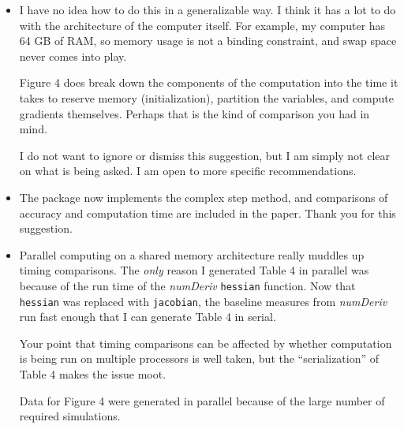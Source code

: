 \documentclass{article}
\newcommand{\pkg}[1]{\emph{#1}}
\newcommand{\code}[1]{\texttt{#1}}
\newcommand{\func}[1]{\code{#1}}
\newenvironment{response}{\normalfont}{\vspace{\baselineskip}}
\begin{document}
\begin{enumerate}[align=left]
\begin{response}
\begin{itemize}
\item I have no idea how to do this in a generalizable way.  I think
  it has a lot to do with the architecture of the computer
  itself.  For example, my computer has 64 GB of RAM, so memory usage
  is not a binding constraint, and swap space never comes into play.

  Figure 4 does break down the components of the computation
  into the time it takes to reserve memory (initialization), partition
  the variables, and compute gradients themselves.  Perhaps that is
  the kind of comparison you had in mind.

  I do not want to ignore or dismiss this suggestion, but I am simply not clear on
  what is being asked.  I am open to more specific recommendations.

\item The package now implements the complex step method, and comparisons of
  accuracy and computation time are included in the paper.  Thank you
  for this suggestion.

\item Parallel computing on a shared memory architecture really
  muddles up timing comparisons.  The \emph{only} reason I generated
  Table 4 in parallel was because of the run time of the \pkg{numDeriv} \func{hessian}
  function. Now that \func{hessian} was replaced with \func{jacobian},
  the baseline measures from \pkg{numDeriv} run fast enough that I can
  generate Table 4 in serial.

Your point that timing comparisons can be affected by
whether computation is being run on multiple processors is well taken, but the
``serialization'' of Table 4 makes the issue moot.

  Data for Figure 4 were generated in parallel because of the large
  number of required simulations.
    \end{itemize}

    
  \end{response}



  


\end{enumerate}
\end{document}
